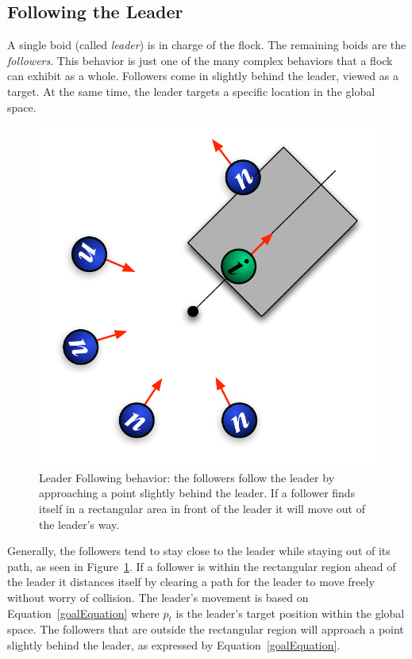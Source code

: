 \subsection{Following the Leader}
A single boid (called \textit{leader}) is in charge of the flock. The remaining boids are the \textit{followers}. This behavior is just one of the many complex behaviors that a flock can exhibit as a whole. Followers come in slightly behind the leader, viewed as a target. At the same time, the leader targets a specific location in the global space. 

\begin{figure}[htbp]
\vspace{16pt}
\begin{center}
\includegraphics[scale=0.75]{figures/leaderFollowing.pdf}
\caption{Leader Following behavior: the followers follow the leader by approaching a point slightly behind the leader. If a follower finds itself in a rectangular area in front of the leader it will move out of the leader's way.}
\label{leaderPDF}
\end{center}
\end{figure}

Generally, the followers tend to stay close to the leader while staying out of its path, as seen in Figure~\ref{leaderPDF}. If a follower is within the rectangular region ahead of the leader it distances itself by clearing a path for the leader to move freely without worry of collision. The leader's movement is  based on Equation~\ref{goalEquation} where $p_t$ is the leader's target position within the global space. The followers that are outside the rectangular region will approach a point slightly behind the leader, as expressed by Equation~\ref{goalEquation}.

